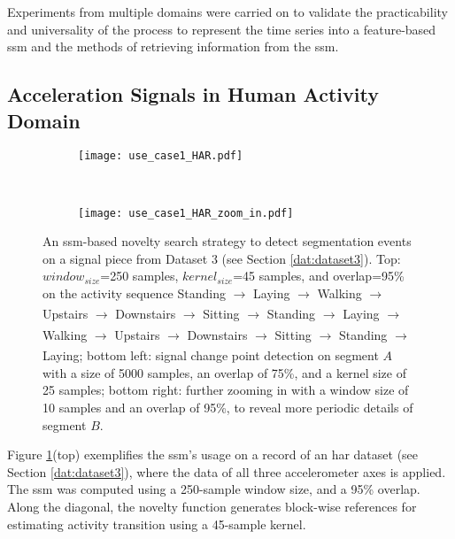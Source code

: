 Experiments from multiple domains were carried on to validate the practicability and universality of the process to represent the time series into a feature-based \gls{ssm} and the methods of retrieving information from the \gls{ssm}.

\subsection{Acceleration Signals in Human Activity Domain}
\label{sec:acc_har}

\begin{figure}
    \centering
    \begin{subfigure}[b]{\textwidth}
        \centering
        \texttt{[image: use\_case1\_HAR.pdf]}
    \end{subfigure}\\
    \vspace{2mm}
    \begin{subfigure}[b]{\textwidth}
         \centering
        \texttt{[image: use\_case1\_HAR\_zoom\_in.pdf]}     
    \end{subfigure}
    \caption{An \gls{ssm}-based novelty search strategy to detect segmentation events on a signal piece from Dataset 3 (see Section \ref{dat:dataset3}). Top: $window_{size}$=250 samples, $kernel_{size}$=45 samples, and overlap=95\% on the activity sequence Standing $\xrightarrow[]{}$ Laying $\xrightarrow[]{}$ Walking $\xrightarrow[]{}$ Upstairs $\xrightarrow[]{}$ Downstairs $\xrightarrow[]{}$ Sitting $\xrightarrow[]{}$ Standing $\xrightarrow[]{}$ Laying $\xrightarrow[]{}$ Walking $\xrightarrow[]{}$ Upstairs
    $\xrightarrow[]{}$ Downstairs $\xrightarrow[]{}$ Sitting $\xrightarrow[]{}$ Standing
    $\xrightarrow[]{}$ Laying; bottom left: signal change point detection on segment $A$ with a size of 5000 samples, an overlap of 75\%, and a kernel size of 25 samples; bottom right: further zooming in with a window size of 10 samples and an overlap of 95\%, to reveal more periodic details of segment $B$.}
    \label{fig:use_case1}
\end{figure}


Figure \ref{fig:use_case1}(top) exemplifies the \gls{ssm}'s usage on a record of an \gls{har} dataset (see Section \ref{dat:dataset3}), where the data of all three accelerometer axes is applied. The \gls{ssm} was computed using a 250-sample window size, and a 95\% overlap. Along the diagonal, the novelty function generates block-wise references for estimating activity transition using a 45-sample kernel.

